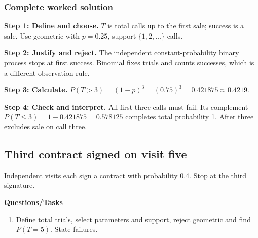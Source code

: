 \subsubsection*{Complete worked solution}
\par\noindent\begin{minipage}{\linewidth}
\textbf{Step 1: Define and choose.} $T$ is total calls up to the first sale; success is a sale. Use geometric with $p=0.25$, support $\{1,2,\ldots\}$ calls.
\end{minipage}\par\medskip
\par\noindent\begin{minipage}{\linewidth}
\textbf{Step 2: Justify and reject.} The independent constant-probability binary process stops at first success. Binomial fixes trials and counts successes, which is a different observation rule.
\end{minipage}\par\medskip
\par\noindent\begin{minipage}{\linewidth}
\textbf{Step 3: Calculate.} $P(T>3)=(1-p)^3=(0.75)^3=0.421875\approx0.4219$.
\end{minipage}\par\medskip
\par\noindent\begin{minipage}{\linewidth}
\textbf{Step 4: Check and interpret.} All first three calls must fail. Its complement $P(T\leq3)=1-0.421875=0.578125$ completes total probability 1. After three excludes sale on call three.
\end{minipage}\par\medskip
{}
\subsection{Third contract signed on visit five}
Independent visits each sign a contract with probability 0.4. Stop at the third signature.

\textbf{Questions/Tasks}
\begin{enumerate}
\item Define total trials, select parameters and support, reject geometric and find $P(T=5)$. State failures.
\end{enumerate}
